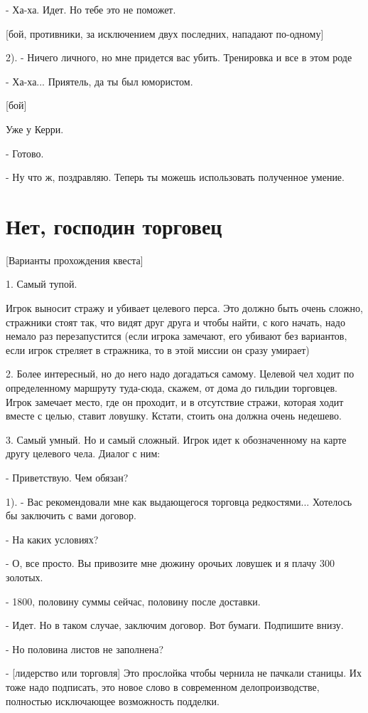 \documentclass[12pt,a4paper]{book}
\begin{document}
- Ха-ха. Идет. Но тебе это не поможет.

[бой, противники, за исключением двух последних, нападают по-одному]

2). - Ничего личного, но мне придется вас убить. Тренировка и все в этом роде

- Ха-ха... Приятель, да ты был юмористом.

[бой]

Уже у Керри.

- Готово.

- Ну что ж, поздравляю. Теперь ты можешь использовать полученное умение.

\section{Нет, господин торговец}

[Варианты прохождения квеста]

1. Самый тупой.

Игрок выносит стражу и убивает целевого перса. Это должно быть очень сложно, стражники стоят так, что видят друг друга и чтобы найти, с кого начать, надо немало раз перезапустится (если игрока замечают, его убивают без вариантов, если игрок стреляет в стражника, то в этой миссии он сразу умирает)

2. Более интересный, но до него надо догадаться самому. Целевой чел ходит по определенному маршруту туда-сюда, скажем, от дома до гильдии торговцев. Игрок замечает место, где он проходит, и в отсутствие стражи, которая ходит вместе с целью, ставит ловушку. Кстати, стоить она должна очень недешево.

3. Самый умный. Но и самый сложный. Игрок идет к обозначенному на карте другу целевого чела. Диалог с ним:

- Приветствую. Чем обязан?

1). - Вас рекомендовали мне как выдающегося торговца редкостями... Хотелось бы заключить с вами договор.

- На каких условиях?

- О, все просто. Вы привозите мне дюжину орочьих ловушек и я плачу 300 золотых.

- 1800, половину суммы сейчас, половину после доставки.

- Идет. Но в таком случае, заключим договор. Вот бумаги. Подпишите внизу.

- Но половина листов не заполнена?

- [лидерство или торговля] Это прослойка чтобы чернила не пачкали станицы. Их тоже надо подписать, это новое слово в современном делопроизводстве, полностью исключающее возможность подделки.
\end{document}
